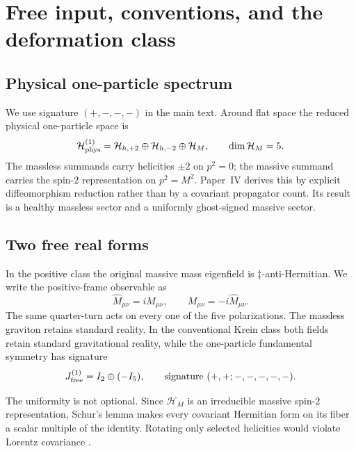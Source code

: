 \documentclass[11pt]{article}
\theoremstyle{definition}
\theoremstyle{remark}
\newcommand{\dd}{\ddagger}
\begin{document}
\section{Free input, conventions, and the deformation class}
\label{sec:free}

\subsection{Physical one-particle spectrum}

We use signature $(+,-,-,-)$ in the main text.  Around flat space the
reduced physical one-particle space is
\begin{equation}\label{eq:oneparticle}
\mathcal H_{\rm phys}^{(1)}=
\mathcal H_{h,+2}\oplus\mathcal H_{h,-2}\oplus\mathcal H_M,
\qquad \dim\mathcal H_M=5.
\end{equation}
The massless summands carry helicities $\pm2$ on $p^2=0$; the massive
summand carries the spin-$2$ representation on $p^2=M^2$.  Paper~IV
derives this by explicit diffeomorphism reduction rather than by a
covariant propagator count.  Its result is a healthy massless sector and
a uniformly ghost-signed massive sector.

\subsection{Two free real forms}

In the positive class the original massive mass eigenfield is
$\dd$-anti-Hermitian.  We write the positive-frame observable as
\begin{equation}\label{eq:quarterturn}
\widehat M_{\mu\nu}=iM_{\mu\nu},
\qquad M_{\mu\nu}=-i\widehat M_{\mu\nu}.
\end{equation}
The same quarter-turn acts on every one of the five polarizations.  The
massless graviton retains standard reality.  In the conventional Krein
class both fields retain standard gravitational reality, while the
one-particle fundamental symmetry has signature
\begin{equation}\label{eq:freesignature}
J^{(1)}_{\rm free}=I_2\oplus(-I_5),
\qquad \text{signature }(+,+;-,-,-,-,-).
\end{equation}

The uniformity is not optional.  Since $\mathcal H_M$ is an irreducible
massive spin-$2$ representation, Schur's lemma makes every covariant
Hermitian form on its fiber a scalar multiple of the identity.  Rotating
only selected helicities would violate Lorentz covariance
\cite{paperIV}.
\end{document}

